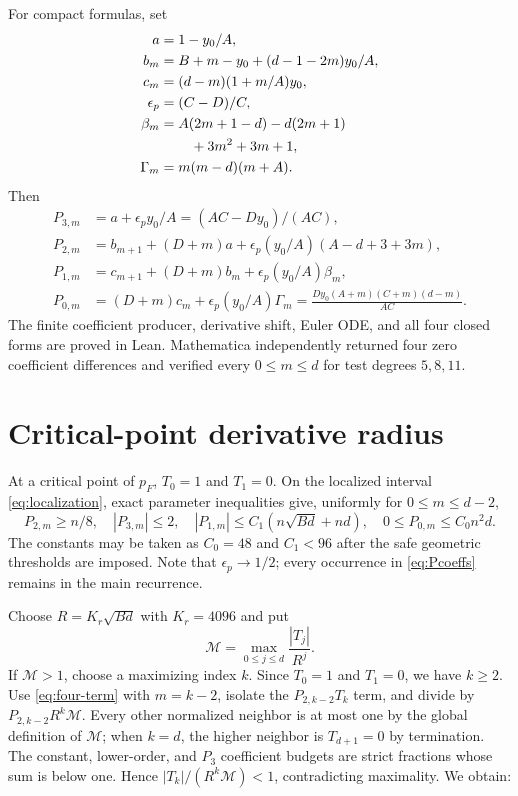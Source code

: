 \documentclass[12pt]{article}
\begin{document}
For compact formulas, set
\begin{align*}
 a&=1-y_0/A,\\
 b_m&=B+m-y_0+(d-1-2m)y_0/A,\\
 c_m&=(d-m)(1+m/A)y_0,\\
 \epsilon_p&=(C-D)/C,\\
 \beta_m&=A(2m+1-d)-d(2m+1)\\
 &\hspace{2.2em}+3m^2+3m+1,\\
 \Gamma_m&=m(m-d)(m+A).
\end{align*}
Then
\begin{align}
 P_{3,m}&=a+\epsilon_p y_0/A=(AC-Dy_0)/(AC),\nonumber\\
 P_{2,m}&=b_{m+1}+(D+m)a
 +\epsilon_p(y_0/A)(A-d+3+3m),\nonumber\\
 P_{1,m}&=c_{m+1}+(D+m)b_m+\epsilon_p(y_0/A)\beta_m,
 \label{eq:Pcoeffs}\\
 P_{0,m}&=(D+m)c_m+\epsilon_p(y_0/A)\Gamma_m
 =\frac{Dy_0(A+m)(C+m)(d-m)}{AC}.\nonumber
\end{align}
The finite coefficient producer, derivative shift, Euler ODE, and all four
closed forms are proved in Lean.  Mathematica independently returned four
zero coefficient differences and verified every $0\le m\le d$ for test
degrees $5,8,11$.

\section{Critical-point derivative radius}\label{sec:radius}

At a critical point of $p_F$, $T_0=1$ and $T_1=0$.  On the localized
interval \eqref{eq:localization}, exact parameter inequalities give,
uniformly for $0\le m\le d-2$,
\begin{equation}\label{eq:recurrence-bounds}
 P_{2,m}\ge n/8,\quad |P_{3,m}|\le2,\quad
 |P_{1,m}|\le C_1(n\sqrt{Bd}+nd),\quad
 0\le P_{0,m}\le C_0n^2d.
\end{equation}
The constants may be taken as $C_0=48$ and $C_1<96$ after the safe geometric
thresholds are imposed.  Note that $\epsilon_p\to1/2$; every occurrence in
\eqref{eq:Pcoeffs} remains in the main recurrence.

Choose $R=K_r\sqrt{Bd}$ with $K_r=4096$ and put
\[
 \mathcal M=\max_{0\le j\le d}\frac{|T_j|}{R^j}.
\]
If $\mathcal M>1$, choose a maximizing index $k$.  Since $T_0=1$ and
$T_1=0$, we have $k\ge2$.  Use \eqref{eq:four-term} with $m=k-2$, isolate
the $P_{2,k-2}T_k$ term, and divide by
$P_{2,k-2}R^k\mathcal M$.  Every other normalized neighbor is at most one
by the global definition of $\mathcal M$; when $k=d$, the higher neighbor is
$T_{d+1}=0$ by termination.  The constant, lower-order, and $P_3$ coefficient
budgets are strict fractions whose sum is below one.  Hence
$|T_k|/(R^k\mathcal M)<1$, contradicting maximality.  We obtain:
\end{document}
